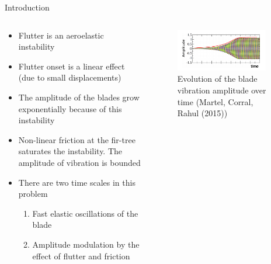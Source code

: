 \documentclass[dvipsnames, aspectratio = 169]{beamer}
\begin{document}
\begin{frame}{Introduction}
	\begin{columns}
		\begin{column}{0.5\textwidth}
			\begin{itemize}
				\item Flutter is an aeroelastic instability
				\item Flutter onset is a linear effect (due to small displacements)
				\item The amplitude of the blades grow exponentially because of this instability
				\item Non-linear friction at the fir-tree saturates the instability. The amplitude of vibration is bounded
				\item There are two time scales in this problem
				      \begin{enumerate}
					      \item Fast elastic oscillations of the blade
					      \item Amplitude modulation by the effect of flutter and friction
				      \end{enumerate}
			\end{itemize}
		\end{column}
		\begin{column}{0.5\textwidth}
			\begin{figure}[h!]
				\centering
				\includegraphics[width = 0.9\textwidth]{amplitude.png}
				\caption{Evolution of the blade vibration amplitude over time (Martel, Corral, Rahul (2015))}
				\label{fig:amplitude_fast_oscillation}
			\end{figure}
		\end{column}
	\end{columns}
\end{frame}
\end{document}
